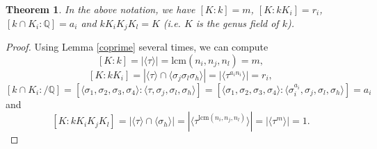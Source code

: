 \documentclass[12pt,a4paper]{article}
\newtheorem{theorem}{Theorem}
\newcommand{\Q}{\mathbb{Q}}
\newcommand{\lcm}{\mathrm{lcm}}
\begin{document}
\begin{theorem}
In the above notation, we have $[K:k]=m$, $[K:kK_i]=r_i$, $[k\cap K_i:\Q]=a_i$ and $kK_iK_jK_l=K$ (i.e. $K$ is the genus field of $k$).
\end{theorem}
\begin{proof}
Using Lemma \ref{coprime} several times, we can compute
$$[K:k]=|\langle\tau\rangle|=\lcm\left(n_i,n_j,n_l\right)=m,$$
$$[K:kK_i]=|\langle\tau\rangle\cap \langle\sigma_j\sigma_l\sigma_h\rangle|=|\langle\tau^{a_in_i}\rangle|=r_i,$$
$$[k\cap K_i:/\Q]=[\langle\sigma_1,\sigma_2,\sigma_3,\sigma_4\rangle:\langle\tau,\sigma_j,\sigma_l,\sigma_h\rangle]=[\langle\sigma_1,\sigma_2,\sigma_3,\sigma_4\rangle:\langle\sigma_i^{a_i},\sigma_j,\sigma_l,\sigma_h\rangle]=a_i$$
and
$$[K:kK_iK_jK_l]=|\langle\tau\rangle\cap \langle\sigma_h\rangle|=|\langle\tau^{\lcm\left(n_i,n_j,n_l\right)}\rangle|=|\langle\tau^m\rangle|=1.$$
\end{proof}
\end{document}
